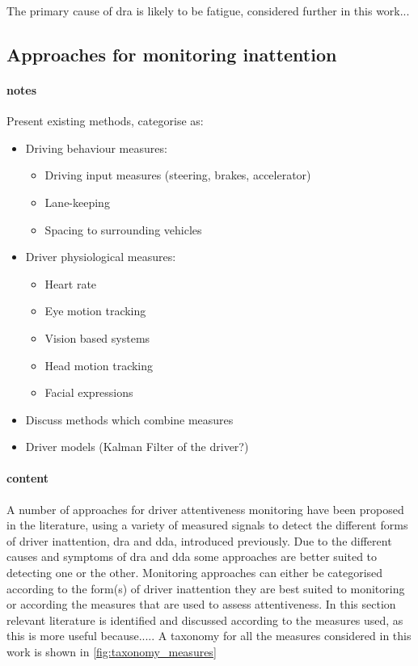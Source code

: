 \documentclass[11pt, parskip=half*,twoside=false]{scrbook}
\begin{document}
The primary cause of \gls{dra} is likely to be fatigue, considered further in this work... 




\subsection{Approaches for monitoring inattention} \label{ssec:approaches}

\paragraph{notes}
Present existing methods, categorise as:
\begin{itemize}
	\item Driving behaviour measures:
	\begin{itemize}
		\item Driving input measures (steering, brakes, accelerator)
		\item Lane-keeping
		\item Spacing to surrounding vehicles
	\end{itemize}
	\item Driver physiological measures:
	\begin{itemize}
		\item Heart rate
		\item Eye motion tracking
		\item Vision based systems
		\item Head motion tracking
		\item Facial expressions
	\end{itemize}
	\item Discuss methods which combine measures
	\item Driver models (Kalman Filter of the driver?)
\end{itemize}

\paragraph{content}
A number of approaches for driver attentiveness monitoring have been proposed in the literature, using a variety of measured signals to detect the different forms of driver inattention, \gls{dra} and \gls{dda}, introduced previously. Due to the different causes and symptoms of \gls{dra} and \gls{dda} some approaches are better suited to detecting one or the other. Monitoring approaches can either be categorised according to the form(s) of driver inattention they are best suited to monitoring or according the measures that are used to assess attentiveness. In this section relevant literature is identified and discussed according to the measures used, as this is more useful because..... A taxonomy for all the measures considered in this work is shown in \cref{fig:taxonomy_measures}
\end{document}
